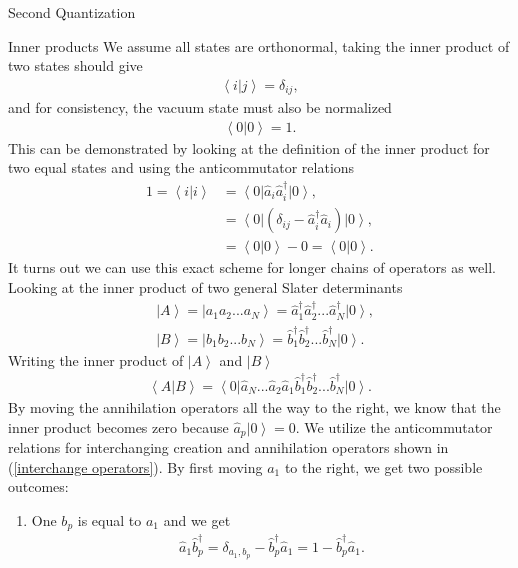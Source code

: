 \documentclass[twoside,english]{uiofysmaster}
\begin{document}
\begin{chapter}{Second Quantization}
	\begin{section}{Inner products}
		We assume all states are orthonormal, taking the inner product of two states should give
		\begin{align}
			\left< i | j \right> = \delta_{ij},
		\end{align}
		and for consistency, the vacuum state must also be normalized
		\begin{align}
			\left< 0 | 0 \right> = 1.
		\end{align}
		This can be demonstrated by looking at the definition of the inner product for two equal states and using the anticommutator relations
		\begin{align}
			1 = \left< i | i \right> &= \left< 0 \right| \hat a_i \hat a_i^\dagger \left| 0 \right>, \\
									 &= \left< 0 \right| (\delta_{ij} - \hat a_i^\dagger \hat a_i) \left| 0 \right>, \\
									 &= \left< 0 | 0 \right> - 0 = \left< 0 | 0 \right>.
		\end{align}
		It turns out we can use this exact scheme for longer chains of operators as well. Looking at the inner product of two general Slater determinants
		\begin{align}
			&\left| A \right> = \left| a_1 a_2 ... a_N \right> = \hat a_1^\dagger \hat a_2^\dagger ... \hat a_N^\dagger \left| 0 \right>, \\
			&\left| B \right> = \left| b_1 b_2 ... b_N \right> = \hat b_1^\dagger \hat b_2^\dagger ... \hat b_N^\dagger \left| 0 \right>.
		\end{align}
		Writing the inner product of $\left| A \right>$ and $\left| B \right>$
		\begin{align}
			\left< A | B \right> = \left< 0 \right| \hat a_N ... \hat a_2 \hat a_1 \hat b_1^\dagger \hat b_2^\dagger ... \hat b_N^\dagger \left| 0 \right>.
		\end{align}
		By moving the annihilation operators all the way to the right, we know that the inner product becomes zero because $\hat a_p \left| 0 \right> = 0$. We utilize the anticommutator relations for interchanging creation and annihilation operators shown in (\ref{interchange operators}). By first moving $a_1$ to the right, we get two possible outcomes:
		\begin{enumerate} 
			\item One $b_p$ is equal to $a_1$ and we get
			\begin{align}
				\hat a_1 \hat b_p^\dagger = \delta_{a_1,b_p} - \hat b_p^\dagger \hat a_1 = 1 - \hat b_p^\dagger \hat a_1 .

\end{align}
\end{enumerate}
\end{section}
\end{chapter}
\end{document}
